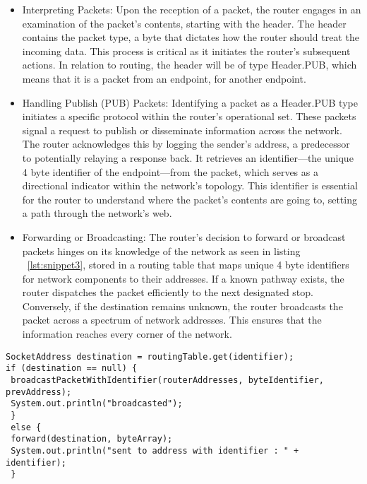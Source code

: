 \documentclass{article}
\begin{document}
\begin{itemize}
	\item Interpreting Packets: Upon the reception of a packet, the router engages in an examination of the packet's contents, starting with the header. The header contains the packet type, a byte that dictates how the router should treat the incoming data. This process is critical as it initiates the router's subsequent actions. In relation to routing, the header will be of type Header.PUB, which means that it is a packet from an endpoint, for another endpoint. 
	\item Handling Publish (PUB) Packets: Identifying a packet as a Header.PUB type initiates a specific protocol within the router's operational set. These packets signal a request to publish or disseminate information across the network. The router acknowledges this by logging the sender's address, a predecessor to potentially relaying a response back. It retrieves an identifier—the unique 4 byte identifier of the endpoint—from the packet, which serves as a directional indicator within the network's topology. This identifier is essential for the router to understand where the packet's contents are going to, setting a path through the network's web.
	\item Forwarding or Broadcasting: The router's decision to forward or broadcast packets hinges on its knowledge of the network as seen in listing ~\ref{lst:snippet3}, stored in a routing table that maps unique 4 byte identifiers for network components to their addresses. If a known pathway exists, the router dispatches the packet efficiently to the next designated stop. Conversely, if the destination remains unknown, the router broadcasts the packet across a spectrum of network addresses. This ensures that the information reaches every corner of the network.
\end{itemize}

\begin{lstlisting}[caption={[code snippet 3] This listing demonstrates the decision to forward or broadcast the packet sent from an endpoint. If an address does not exist in the routing table with the macthing identifier, the packet gets broadcasted. If an address does exist in the routing table with the matching identifier, the packet is forwarded to the destination. }, label={lst:snippet3}]
SocketAddress destination = routingTable.get(identifier);
if (destination == null) {
 broadcastPacketWithIdentifier(routerAddresses, byteIdentifier, prevAddress);
 System.out.println("broadcasted");
 }
 else {
 forward(destination, byteArray);
 System.out.println("sent to address with identifier : " + identifier);
 }
\end{lstlisting}
\end{document}
